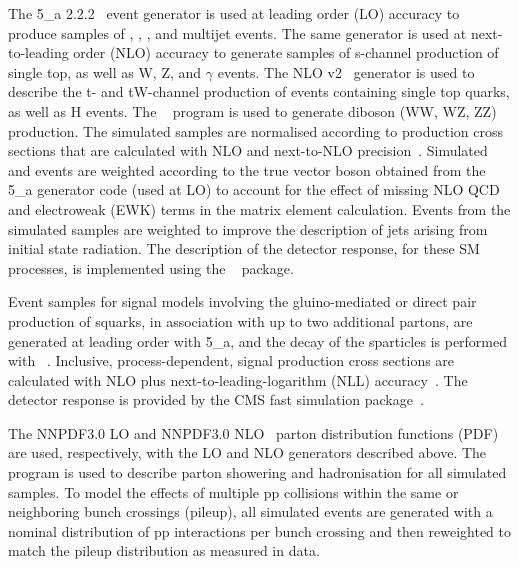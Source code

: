 The {\MADGRAPH{}5\_a\MCATNLO} 2.2.2~\cite{Alwall2014} event generator
is used at leading order (LO) accuracy to produce samples of \wj, \zj,
\ttbar, and multijet events. The same generator is used at
next-to-leading order (NLO) accuracy to generate samples of s-channel
production of single top, as well as {\ttbar}W, {\ttbar}Z, and
{\ttbar}$\gamma$ events. The NLO \POWHEG v2~\cite{powheg,
  powheg_top_Wt} generator is used to describe the t- and tW-channel
production of events containing single top quarks, as well as
{\ttbar}H events. The ~\cite{pythia} program is used to
generate diboson (WW, WZ, ZZ) production. The simulated samples are
normalised according to production cross sections that are calculated
with NLO and next-to-NLO precision~\cite{Alwall2014, wphys, fewz,
  wwxs, top++, nlotop, powheg_top_Wt}. Simulated \wj and \zj events
are weighted according to the true vector boson \pt obtained from the
{\MADGRAPH{}5\_a\MCATNLO} generator code (used at LO) to account for
the effect of missing NLO QCD and electroweak (EWK) terms in the
matrix element calculation. Events from the \ttbar simulated samples
are weighted to improve the description of jets arising from initial
state radiation. The description of the detector response, for these
SM processes, is implemented using the \GEANTfour~\cite{geant}
package.

Event samples for signal models involving the gluino-mediated or
direct pair production of squarks, in association with up to two
additional partons, are generated at leading order with
{\MADGRAPH{}5\_a\MCATNLO}, and the decay of the sparticles is
performed with ~\cite{pythia}. Inclusive,
process-dependent, signal production cross sections are calculated
with NLO plus next-to-leading-logarithm (NLL)
accuracy~\cite{Beenakker:1996ch, PhysRevLett.102.111802,
  PhysRevD.80.095004, 1126-6708-2009-12-041,
  doi:10.1142/S0217751X11053560, susynlo}. The detector response is
provided by the CMS fast simulation package~\cite{fastsim}.

The \textsc{NNPDF}3.0 LO and \textsc{NNPDF}3.0 NLO~\cite{nnpdf} parton
distribution functions (PDF) are used, respectively, with the LO and
NLO generators described above. The ~\cite{pythia} program
is used to describe parton showering and hadronisation for all
simulated samples. To model the effects of multiple pp collisions
within the same or neighboring bunch crossings (pileup), all simulated
events are generated with a nominal distribution of pp interactions
per bunch crossing and then reweighted to match the pileup
distribution as measured in data.

